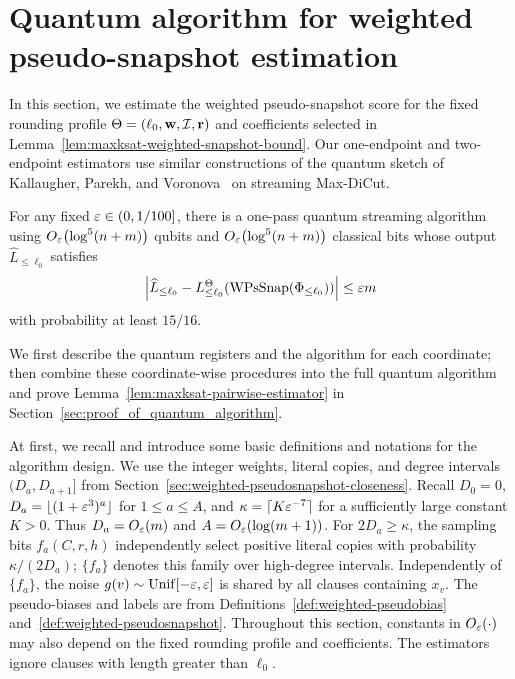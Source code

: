 \section{Quantum algorithm for weighted pseudo-snapshot estimation}

In this section, we estimate the weighted pseudo-snapshot score for the fixed rounding profile $\Theta=(\ell_0,\mathbf{w},\mathcal I,\mathbf{r})$ and coefficients selected in Lemma~\ref{lem:maxksat-weighted-snapshot-bound}.
Our one-endpoint and two-endpoint estimators use similar constructions  of  the quantum sketch of Kallaugher, Parekh, and Voronova~\cite{KPV23} on streaming Max-DiCut.

\begin{lemma}
\label{lem:maxksat-pairwise-estimator}
For any fixed $\varepsilon\in(0,1/100]$, there is a one-pass quantum streaming algorithm using $O_\varepsilon\!\left(\log^5(n+m)\right)$ qubits and $O_\varepsilon\!\left(\log^5(n+m)\right)$ classical bits whose output $\widehat L_{\le\ell_0}$ satisfies
\[
  \left|\widehat L_{\le\ell_0}
    -L_{\le\ell_0}^\Theta(\operatorname{WPsSnap}(\Phi_{\le\ell_0}))\right|
  \le\varepsilon m
\]
with probability at least $15/16$.
\end{lemma}
We first describe the quantum registers and the algorithm for each coordinate;  then combine these coordinate-wise procedures into the full quantum algorithm and prove Lemma~\ref{lem:maxksat-pairwise-estimator} in Section~\ref{sec:proof_of_quantum_algorithm}.




\medskip
At first, we recall and introduce some basic definitions and notations for the algorithm design. 
We use the integer weights, literal copies, and degree intervals $(D_a,D_{a+1}]$ from Section~\ref{sec:weighted-pseudosnapshot-closeness}. Recall $D_0=0$, $D_a=\lfloor(1+\varepsilon^3)^a\rfloor$ for $1\le a\le A$, and $\kappa=\lceil K\varepsilon^{-7}\rceil$ for a sufficiently large constant $K>0$. Thus $D_a=O_\varepsilon(m)$ and $A=O_\varepsilon(\log(m+1))$.
For $2D_a\ge\kappa$, the sampling bits $f_a(C,r,h)$ independently select positive literal copies with probability $\kappa/(2D_a)$; $\{f_a\}$ denotes this family over high-degree intervals. Independently of $\{f_a\}$, the noise $g(v)\sim\operatorname{Unif}[-\varepsilon,\varepsilon]$ is shared by all clauses containing $x_v$.
The pseudo-biases and labels are from Definitions~\ref{def:weighted-pseudobias} and~\ref{def:weighted-pseudosnapshot}.
Throughout this section, constants in $O_\varepsilon(\cdot)$ may also depend on the fixed rounding profile and coefficients.
The estimators ignore clauses with length greater than $\ell_0$.

